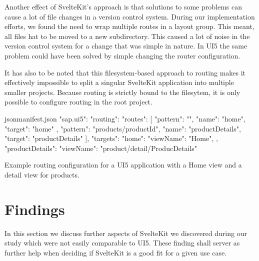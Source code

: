 Another effect of SvelteKit's approach is that solutions to some problems can cause a lot of file changes in a version control system. During our implementation efforts, we found the need to wrap multiple routes in a layout group. This meant, all files hat to be moved to a new subdirectory. This caused a lot of noise in the version control system for a change that was simple in nature. In UI5 the same problem could have been solved by simple changing the router configuration.

It has also to be noted that this filesystem-based approach to routing makes it effectively impossible to split a singular SvelteKit application into multiple smaller projects. Because routing is strictly bound to the filesytem, it is only possible to configure routing in the root project.

\begin{listing}[H]
\begin{myminted}{json}{manifest.json}
{
  "sap.ui5": {
    "routing": {
      "routes": [
        {
          "pattern": "",
          "name": "home",
          "target": "home"
        },
        {
          "pattern": "products/{productId}",
          "name": "productDetails",
          "target": "productDetails"
        }
      ],
      "targets": {
        "home": {
          "viewName": "Home",
        },
        "productDetails": {
          "viewName": "product/detail/ProducDetails"
        }
      }
    }
  }
}
\end{myminted}
\caption{Example routing configuration for a UI5 application with a Home view and a detail view for products.}
\label{fig:evaluation-ui5-routing}
\end{listing}

\section{Findings}
In this section we discuss further aspects of SvelteKit we discovered during our study which were not easily comparable to UI5. These finding shall server as further help when deciding if SvelteKit is a good fit for a given use case.



